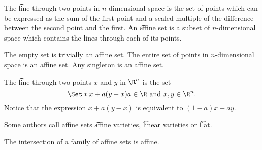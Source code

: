


The \t{line through} two points in $n$-dimensional space is the set of points which can be expressed as the sum of the first point and a scaled multiple of the difference between the second point and the first.
An \t{affine set} is a subset of $n$-dimensional space which contains the lines through each of its points.


The empty set is trivially an affine set.
The entire set of points in $n$-dimensional space is an affine set.
Any singleton is an affine set.


The \t{line through} two points $x$ and $y$ in $\R^n$ is the set
$$
  \Set*{x + a(y - x)}{a \in \R \text{ and } x, y \in \R^n}.
$$
Notice that the expression $x + a(y - x)$ is equivalent to $(1 - a)x + ay$.


Some authors call affine sets \t{affine varieties}, \t{linear varieties} or \t{flat}.

\begin{prop}
  The intersection of a family of affine sets is affine.
\end{prop}

\blankpage
